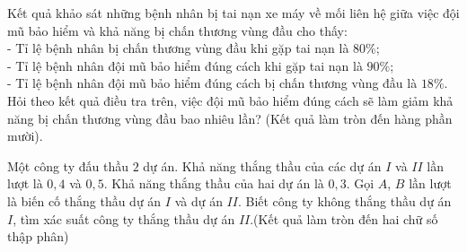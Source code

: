 \begin{ex}%
	Kết quả khảo sát những bệnh nhân bị tai nạn xe máy về mối liên hệ giữa việc đội mũ bảo hiểm và khả năng bị chấn thương vùng đầu cho thấy:\\
	- Tỉ lệ bệnh nhân bị chấn thương vùng đầu khi gặp tai nạn là $80 \%$;\\
	- Tỉ lệ bệnh nhân đội mũ bảo hiểm đúng cách khi gặp tai nạn là $90 \%$;\\
	- Tỉ lệ bệnh nhân đội mũ bảo hiểm đúng cách bị chấn thương vùng đầu là $18 \%$.\\
	Hỏi theo kết quả điều tra trên, việc đội mũ bảo hiểm đúng cách sẽ làm giảm khả năng bị chấn thương vùng đầu bao nhiêu lần? (Kết quả làm tròn đến hàng phần mười).
\end{ex}

\begin{ex}%
	Một công ty đấu thầu $2$ dự án. Khả năng thắng thầu của các dự án $I$ và $II$ lần lượt là $0{,}4$ và $0{,}5$. Khả năng thắng thầu của hai dự án là $0{,}3$. Gọi $A$, $B$ lần lượt là biến cố thắng thầu dự án $I$ và dự án $II$. Biết công ty không thắng thầu dự án $I$, tìm xác suất công ty thắng thầu dự án $II$.(Kết quả làm tròn đến hai chữ số thập phân)
\end{ex}

